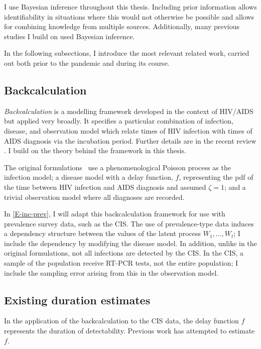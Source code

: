 \documentclass[thesis.tex]{subfiles}
\begin{document}
I use Bayesian inference throughout this thesis.
Including prior information allows identifiability in situations where this would not otherwise be possible and allows for combining knowledge from multiple sources.
Additionally, many previous studies I build on used Bayesian inference.

In the following subsections, I introduce the most relevant related work, carried out both prior to the pandemic and during its course.

\subsection{Backcalculation}

\emph{Backcalculation} is a modelling framework developed in the context of HIV/AIDS~\autocite{brookmeyerMethod} but applied very broadly.
It specifies a particular combination of infection, disease, and observation model which relate times of HIV infection with times of AIDS diagnosis via the incubation period.
Further details are in the recent review \textcite{sunModeling}.
I build on the theory behind the framework in this thesis.

The original formulations~\autocite{brookmeyerMethod,rosenbergBackcalculation} use a phenomenological Poisson process as the infection model; a disease model with a delay function, $f$, representing the pdf of the time between HIV infection and AIDS diagnosis and assumed $\zeta=1$; and a trivial observation model where all diagnoses are recorded.

In \cref{E-inc-prev}, I will adapt this backcalculation framework for use with prevalence survey data, such as the CIS.
The use of prevalence-type data induces a dependency structure between the values of the latent process $W_1, \dots, W_t$; I include the dependency by modifying the disease model.
In addition, unlike in the original formulations, not all infections are detected by the CIS.
In the CIS, a sample of the population receive RT-PCR tests, not the entire population; I include the sampling error arising from this in the observation model.

\subsection{Existing duration estimates} \label{intro:sec:previous-duration-estimates}

In the application of the backcalculation to the CIS data, the delay function $f$ represents the duration of detectability.
Previous work has attempted to estimate $f$.
\end{document}
